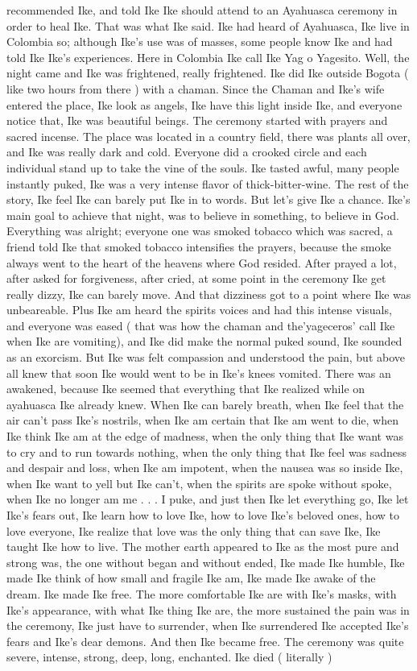 \documentclass[12pt]{book}
\begin{document}
recommended Ike, and told Ike Ike should attend to an Ayahuasca ceremony in order to heal Ike. That was what Ike said. Ike had heard of Ayahuasca, Ike live in Colombia so; although Ike's use was of masses, some people know Ike and had told Ike Ike's experiences. Here in Colombia Ike call Ike Yag o Yagesito. Well, the night came and Ike was frightened, really frightened. Ike did Ike outside Bogota ( like two hours from there ) with a chaman. Since the Chaman and Ike's wife entered the place, Ike look as angels, Ike have this light inside Ike, and everyone notice that, Ike was beautiful beings. The ceremony started with prayers and sacred incense. The place was located in a country field, there was plants all over, and Ike was really dark and cold. Everyone did a crooked circle and each individual stand up to take the vine of the souls. Ike tasted awful, many people instantly puked, Ike was a very intense flavor of thick-bitter-wine. The rest of the story, Ike feel Ike can barely put Ike in to words. But let's give Ike a chance. Ike's main goal to achieve that night, was to believe in something, to believe in God. Everything was alright; everyone one was smoked tobacco which was sacred, a friend told Ike that smoked tobacco intensifies the prayers, because the smoke always went to the heart of the heavens where God resided. After prayed a lot, after asked for forgiveness, after cried, at some point in the ceremony Ike get really dizzy, Ike can barely move. And that dizziness got to a point where Ike was unbeareable. Plus Ike am heard the spirits voices and had this intense visuals, and everyone was eased ( that was how the chaman and the'yageceros' call Ike when Ike are vomiting), and Ike did make the normal puked sound, Ike sounded as an exorcism. But Ike was felt compassion and understood the pain, but above all knew that soon Ike would went to be in Ike's knees vomited. There was an awakened, because Ike seemed that everything that Ike realized while on ayahuasca Ike already knew. When Ike can barely breath, when Ike feel that the air can't pass Ike's nostrils, when Ike am certain that Ike am went to die, when Ike think Ike am at the edge of madness, when the only thing that Ike want was to cry and to run towards nothing, when the only thing that Ike feel was sadness and despair and loss, when Ike am impotent, when the nausea was so inside Ike, when Ike want to yell but Ike can't, when the spirits are spoke without spoke, when Ike no longer am me . . . I puke, and just then Ike let everything go, Ike let Ike's fears out, Ike learn how to love Ike, how to love Ike's beloved ones, how to love everyone, Ike realize that love was the only thing that can save Ike, Ike taught Ike how to live. The mother earth appeared to Ike as the most pure and strong was, the one without began and without ended, Ike made Ike humble, Ike made Ike think of how small and fragile Ike am, Ike made Ike awake of the dream. Ike made Ike free. The more comfortable Ike are with Ike's masks, with Ike's appearance, with what Ike thing Ike are, the more sustained the pain was in the ceremony, Ike just have to surrender, when Ike surrendered Ike accepted Ike's fears and Ike's dear demons. And then Ike became free. The ceremony was quite severe, intense, strong, deep, long, enchanted. Ike died ( literally ) 
\end{document}
